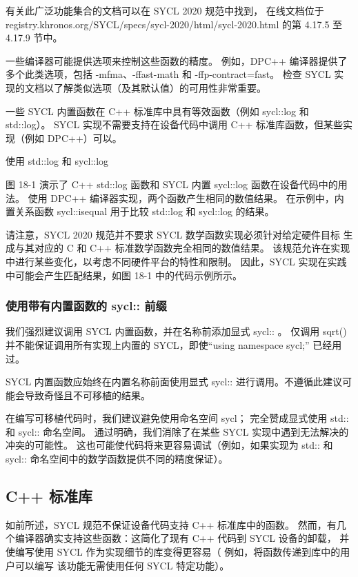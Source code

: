 有关此广泛功能集合的文档可以在 SYCL 2020 规范中找到，
在线文档位于registry.khronos.org/SYCL/specs/sycl-2020/html/sycl-2020.html 的第 4.17.5 至 4.17.9 节中。

一些编译器可能提供选项来控制这些函数的精度。 
例如，DPC++ 编译器提供了多个此类选项，包括 -mfma、-ffast-math 和 -ffp-contract=fast。 
检查 SYCL 实现的文档以了解类似选项（及其默认值）的可用性非常重要。

一些 SYCL 内置函数在 C++ 标准库中具有等效函数（例如 sycl::log 和 std::log）。 
SYCL 实现不需要支持在设备代码中调用 C++ 标准库函数，但某些实现（例如 DPC++）可以。

{\color{red} 使用 std::log 和 sycl::log}

图 18-1 演示了 C++ std::log 函数和 SYCL 内置 sycl::log 函数在设备代码中的用法。 
使用 DPC++ 编译器实现，两个函数产生相同的数值结果。 
在示例中，内置关系函数 sycl::isequal 用于比较 std::log 和 sycl::log 的结果。

请注意，SYCL 2020 规范并不要求 SYCL 数学函数实现必须针对给定硬件目标
生成与其对应的 C 和 C++ 标准数学函数完全相同的数值结果。 
该规范允许在实现中进行某些变化，以考虑不同硬件平台的特性和限制。 
因此，SYCL 实现在实践中可能会产生匹配结果，如图 18-1 中的代码示例所示。

\subsubsection{使用带有内置函数的 sycl:: 前缀}
我们强烈建议调用 SYCL 内置函数，并在名称前添加显式 sycl:: 。 
仅调用 sqrt() 并不能保证调用所有实现上内置的 SYCL，即使“using namespace sycl;” 已经用过。

\begin{remark}
	SYCL 内置函数应始终在内置名称前面使用显式 sycl:: 进行调用。不遵循此建议可能会导致奇怪且不可移植的结果。
\end{remark}

在编写可移植代码时，我们建议避免使用命名空间 sycl； 完全赞成显式使用 std:: 和 sycl:: 命名空间。 
通过明确，我们消除了在某些 SYCL 实现中遇到无法解决的冲突的可能性。 
这也可能使代码将来更容易调试（例如，如果实现为 std:: 和 sycl:: 命名空间中的数学函数提供不同的精度保证）。

\subsection{C++ 标准库}
如前所述，SYCL 规范不保证设备代码支持 C++ 标准库中的函数。 
然而，有几个编译器确实支持这些函数：这简化了现有 C++ 代码到 SYCL 设备的卸载，
并使编写使用 SYCL 作为实现细节的库变得更容易（
例如，将函数传递到库中的用户可以编写 该功能无需使用任何 SYCL 特定功能）。

